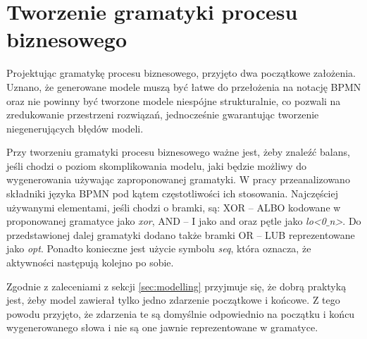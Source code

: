 \section{Tworzenie gramatyki procesu biznesowego}
\label{sec:businessGrammarCreation}
Projektując gramatykę procesu biznesowego, przyjęto dwa początkowe założenia. Uznano, że generowane modele muszą być łatwe do przełożenia na notację BPMN oraz nie powinny być tworzone modele niespójne strukturalnie, co pozwali na zredukowanie przestrzeni rozwiązań, jednocześnie gwarantując tworzenie niegenerujących błędów modeli.

Przy tworzeniu gramatyki procesu biznesowego ważne jest, żeby znaleźć balans, jeśli chodzi o poziom skomplikowania modelu, jaki będzie możliwy do wygenerowania używając zaproponowanej gramatyki.  W pracy \cite{10.1007/978-3-540-69534-9_35} przeanalizowano składniki języka BPMN pod kątem częstotliwości ich stosowania. Najczęściej używanymi elementami, jeśli chodzi o bramki, są: XOR -- ALBO kodowane w proponowanej gramatyce jako \textit{xor}, AND -- I jako and oraz pętle jako \textit{lo<0$\_$n>}. Do przedstawionej dalej gramatyki dodano także bramki OR -- LUB reprezentowane jako \textit{opt}. Ponadto konieczne jest użycie symbolu \textit{seq}, która oznacza, że aktywności następują kolejno po sobie.

Zgodnie z zaleceniami z sekcji \ref{sec:modelling} przyjmuje się, że dobrą praktyką jest, żeby model zawierał tylko jedno zdarzenie początkowe i końcowe. Z tego powodu przyjęto, że zdarzenia te są domyślnie odpowiednio na początku i końcu wygenerowanego słowa i nie są one jawnie reprezentowane w gramatyce.

